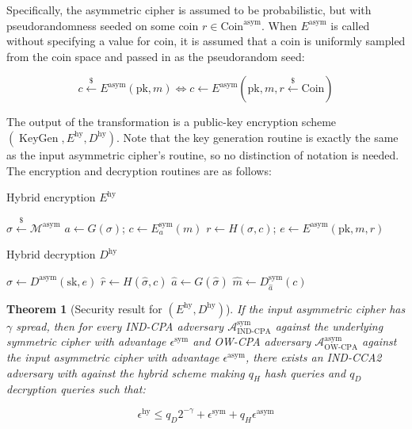 \documentclass{article}
\newcommand{\leftsample}{\overset{{\scriptscriptstyle\$}}{\leftarrow}}
\newtheorem{theorem}{Theorem}[section]
\begin{document}
Specifically, the asymmetric cipher is assumed to be probabilistic, but with pseudorandomness seeded on some coin $r \in \text{Coin}^\text{asym}$. When $E^\text{asym}$ is called without specifying a value for coin, it is assumed that a coin is uniformly sampled from the coin space and passed in as the pseudorandom seed:

$$
    c \leftsample E^\text{asym}(\text{pk}, m) 
    \Leftrightarrow 
    c \leftarrow E^\text{asym}(\text{pk}, m, r \leftsample \text{Coin})
$$

The output of the transformation is a public-key encryption scheme $(\operatorname{KeyGen}, E^\text{hy}, D^\text{hy})$. Note that the key generation routine is exactly the same as the input asymmetric cipher's routine, so no distinction of notation is needed. The encryption and decryption routines are as follows:

\begin{multicols}{2}
    \begin{algorithm}[H]
        \SetAlgoLined
        \caption{Hybrid encryption $E^\text{hy}$}
        $\sigma \leftsample \mathcal{M}^\text{asym}$\;
        $a \leftarrow G(\sigma)$; $c \leftarrow E^\text{sym}_a(m)$\;
        $r \leftarrow H(\sigma, c)$;
        $e \leftarrow E^\text{asym}(\text{pk}, m, r)$\;
        \;
    \end{algorithm}

    \columnbreak

    \begin{algorithm}[H]
        \SetAlgoLined
        \caption{Hybrid decryption $D^\text{hy}$}
        $\hat{\sigma} \leftarrow D^\text{asym}(\text{sk}, e)$\;
        $\hat{r} \leftarrow H(\hat{\sigma}, c)$\;
        $\hat{a} \leftarrow G(\hat{\sigma})$\;
        $\hat{m} \leftarrow D^\text{sym}_{\hat{a}}(c)$\;
        \;
    \end{algorithm}
\end{multicols}

\begin{theorem}[Security result for $(E^\text{hy}, D^\text{hy})$]
    If the input asymmetric cipher has $\gamma$ spread, then for every IND-CPA adversary $\mathcal{A}^\text{sym}_\text{IND-CPA}$ against the underlying symmetric cipher with advantage $\epsilon^\text{sym}$ and OW-CPA adversary $\mathcal{A}^\text{asym}_\text{OW-CPA}$ against the input asymmetric cipher with advantage $\epsilon^\text{asym}$, there exists an IND-CCA2 adversary with against the hybrid scheme making $q_H$ hash queries and $q_D$ decryption queries such that:

    \begin{equation*}
        \epsilon^\text{hy} 
        \leq q_D2^{-\gamma} 
            + \epsilon^\text{sym} 
            + q_H\epsilon^\text{asym}
    \end{equation*}
\end{theorem}
\end{document}
